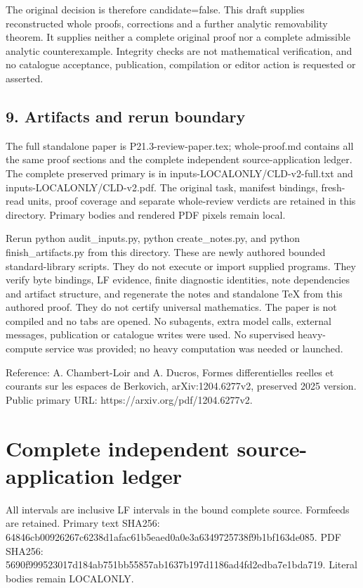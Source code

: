 \documentclass[11pt]{article}
\begin{document}
The original decision is therefore candidate=false. This draft supplies reconstructed whole proofs, corrections and a further analytic removability theorem. It supplies neither a complete original proof nor a complete admissible analytic counterexample. Integrity checks are not mathematical verification, and no catalogue acceptance, publication, compilation or editor action is requested or asserted.

\subsection{9. Artifacts and rerun boundary}

The full standalone paper is P21.3-review-paper.tex; whole-proof.md contains all the same proof sections and the complete independent source-application ledger. The complete preserved primary is in inputs-LOCALONLY/CLD-v2-full.txt and inputs-LOCALONLY/CLD-v2.pdf. The original task, manifest bindings, fresh-read units, proof coverage and separate whole-review verdicts are retained in this directory. Primary bodies and rendered PDF pixels remain local.

Rerun python audit\_inputs.py, python create\_notes.py, and python finish\_artifacts.py from this directory. These are newly authored bounded standard-library scripts. They do not execute or import supplied programs. They verify byte bindings, LF evidence, finite diagnostic identities, note dependencies and artifact structure, and regenerate the notes and standalone TeX from this authored proof. They do not certify universal mathematics. The paper is not compiled and no tabs are opened. No subagents, extra model calls, external messages, publication or catalogue writes were used. No supervised heavy-compute service was provided; no heavy computation was needed or launched.

Reference: A. Chambert-Loir and A. Ducros, Formes differentielles reelles et courants sur les espaces de Berkovich, arXiv:1204.6277v2, preserved 2025 version. Public primary URL: https://arxiv.org/pdf/1204.6277v2.

\section{Complete independent source-application ledger}

All intervals are inclusive LF intervals in the bound complete source. Formfeeds are retained. Primary text SHA256: 64846cb00926267c6238d1afac61b5eaed0a0e3a6349725738f9b1bf163de085. PDF SHA256: 5690f999523017d184ab751bb55857ab1637b197d1186ad4fd2edba7e1bda719. Literal bodies remain LOCALONLY.
\end{document}
